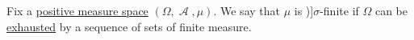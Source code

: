 \begin{definition}\label{def:sigma_finite_measure}
  Fix a \hyperref[def:measure_space/positive]{positive measure space} \( (\Omega, \mscrA, \mu) \). We say that \( \mu \) is \term[ru=\( \sigma \)-крайний (\cite[def. 1.6.1]{Богачёв2003ТеорияМерыТом1})]{\( \sigma \)-finite} if \( \Omega \) can be \hyperref[def:exhausting_sequence]{exhausted} by a sequence of sets of finite measure.
\end{definition}

